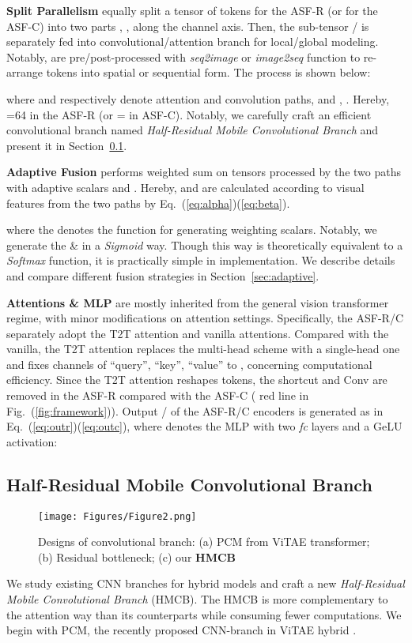 \documentclass[lettersize,journal]{IEEEtran}
\begin{document}
\textbf{Split Parallelism} equally split a tensor of tokens  for the ASF-R (or  for the ASF-C) into two parts , , along the channel axis. Then, the sub-tensor / is separately fed into convolutional/attention branch for local/global modeling. Notably,  are pre/post-processed with \textit{seq2image} or \textit{image2seq} function \cite{yuan2021tokens} to re-arrange tokens into spatial or sequential form. The process is shown below:

where  and  respectively denote attention and convolution paths, and ,  . Hereby, =64  in the ASF-R (or = in ASF-C). Notably, we carefully craft an efficient convolutional branch named \textit{Half-Residual Mobile Convolutional Branch} and present it in Section~\ref{sec:conv}. 

\textbf{Adaptive Fusion} performs weighted sum on tensors processed by the two paths with adaptive scalars  and . Hereby,  and  are calculated according to visual features from the two paths by Eq.~(\ref{eq:alpha})(\ref{eq:beta}). 

where the  denotes the function for generating weighting scalars. Notably, we generate the  \&  in a \textit{Sigmoid} way. Though this way is theoretically equivalent to a \textit{Softmax} function, it is practically simple in implementation. We describe details and compare different fusion strategies in Section~\ref{sec:adaptive}.

\textbf{Attentions \& MLP} are mostly inherited from the general vision transformer regime, with minor modifications on attention settings. Specifically, the ASF-R/C separately adopt the T2T attention and vanilla attentions. Compared with the vanilla, the T2T attention replaces the multi-head scheme with a single-head one and fixes channels of ``query'', ``key'', ``value'' to , concerning computational efficiency. Since the T2T attention reshapes tokens, the shortcut and Conv  are removed in the ASF-R compared with the ASF-C ({\color{red} red} line in Fig.~(\ref{fig:framework})). Output / of the ASF-R/C encoders is generated as in Eq.~(\ref{eq:outr})(\ref{eq:outc}), where  denotes the MLP with two \textit{fc} layers and a GeLU activation:


\subsection{Half-Residual Mobile Convolutional Branch}
\label{sec:conv}
\begin{figure}
\centering
\texttt{[image: Figures/Figure2.png]}
\caption{Designs of convolutional branch: (a) PCM from ViTAE transformer\cite{Xu2021ViTAEVT}; (b) Residual bottleneck; (c) our \textbf{HMCB}}
\label{fig:convbranch}
\end{figure}
We study existing CNN branches for hybrid models and craft a new \textit{Half-Residual Mobile Convolutional Branch} (HMCB). The HMCB is more complementary to the attention way than its counterparts while consuming fewer computations. We begin with PCM, the recently proposed CNN-branch in ViTAE hybrid \cite{Xu2021ViTAEVT}.
\end{document}
